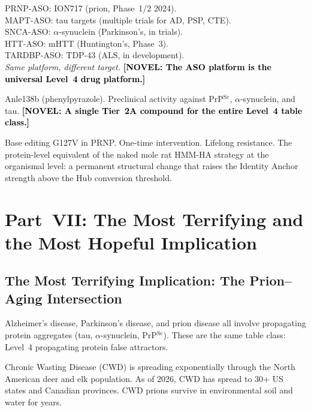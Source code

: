 \documentclass[12pt,a4paper]{article}
\newcommand{\prpsc}{PrP$^{\mathrm{Sc}}$}
\newcommand{\novel}[1]{\textbf{\textcolor{black}{[NOVEL: #1]}}}
\begin{document}
\begin{description}[leftmargin=2em]
  \item[\textbf{Tier~2 --- Substrate removal (ASO platform):}]
    PRNP-ASO: ION717 (prion, Phase~1/2 2024).\\
    MAPT-ASO: tau targets (multiple trials for AD, PSP, CTE).\\
    SNCA-ASO: $\alpha$-synuclein (Parkinson's, in trials).\\
    HTT-ASO: mHTT (Huntington's, Phase~3).\\
    TARDBP-ASO: TDP-43 (ALS, in development).\\
    \textit{Same platform, different target.}
    \novel{The ASO platform is the universal Level~4 drug platform.}

  \item[\textbf{Tier~2A --- Conformation stabilisation:}]
    Anle138b (phenylpyrazole). Preclinical activity against \prpsc{},
    $\alpha$-synuclein, and tau.
    \novel{A single Tier~2A compound for the entire Level~4 table class.}

  \item[\textbf{Tier~3 --- Permanent $R_{\mathrm{PRION}}$ elevation:}]
    Base editing G127V in PRNP. One-time intervention. Lifelong resistance.
    The protein-level equivalent of the naked mole rat HMM-HA strategy at
    the organismal level: a permanent structural change that raises the
    Identity Anchor strength above the Hub conversion threshold.
\end{description}

\section{Part~VII: The Most Terrifying and the Most Hopeful Implication}

\subsection{The Most Terrifying Implication: The Prion--Aging Intersection}

Alzheimer's disease, Parkinson's disease, and prion disease all involve
propagating protein aggregates (tau, $\alpha$-synuclein, \prpsc{}). These
are the same table class: Level~4 propagating protein false attractors.

Chronic Wasting Disease (CWD) is spreading exponentially through the North
American deer and elk population. As of 2026, CWD has spread to 30+ US
states and Canadian provinces. CWD prions survive in environmental soil and
water for years.
\end{document}

